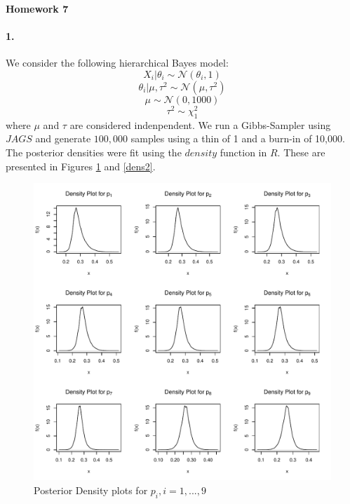 \documentclass[12pt, leqno]{article}
\providecommand{\normd}{\mathcal{N}} %
\begin{document}
\pagestyle{fancy}

\begin{center}
{\large {\bf Homework 7}} \\
\end{center}

\paragraph{1.} We consider the following hierarchical Bayes model:
\[
X_i|\theta_i \sim \normd (\theta_i,1)
\]
\[
\theta_i| \mu, \tau^2 \sim \normd (\mu,\tau^2)
\]
\[
\mu \sim \normd(0,1000)
\]
\[
\tau^2 \sim \chi^2_1
\]
where $\mu$ and $\tau$ are considered indenpendent.
We run a Gibbs-Sampler using $JAGS$ and generate $100,000$ samples
using a thin of 1 and a burn-in of 10,000. The posterior densities
were fit using the $density$ function in $R$. These are presented in Figures
\ref{dens1} and \ref{dens2}.
\begin{figure}
\begin{center}
  \includegraphics[scale=0.8]{pdensity1.pdf}
\end{center}
\caption{Posterior Density plots for $p_i, i = 1, ..., 9$} 
\label{dens1}
\end{figure} 
\end{document}

